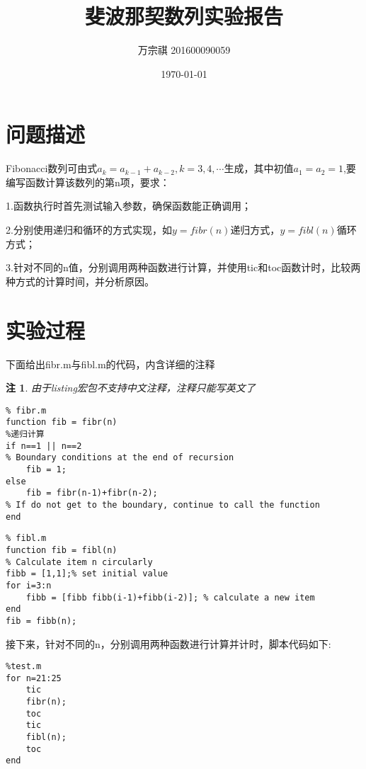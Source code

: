 \documentclass[UTF8]{article}
\title{斐波那契数列实验报告}
\author{万宗祺 201600090059}
\date{\today}
\newtheorem*{note}{注}
\begin{document}
\maketitle
\tableofcontents
\section{问题描述}
Fibonacci数列可由式$a_k = a_{k-1}+a_{k-2},k=3,4,\cdots$生成，其中初值$a_1=a_2=1$,要编写函数计算该数列的第n项，要求：

1.函数执行时首先测试输入参数，确保函数能正确调用；

2.分别使用递归和循环的方式实现，如$y=fibr(n)$递归方式，$y=fibl(n)$循环方式；

3.针对不同的n值，分别调用两种函数进行计算，并使用tic和toc函数计时，比较两种方式的计算时间，并分析原因。

\section{实验过程}
下面给出fibr.m与fibl.m的代码，内含详细的注释
\begin{note}
由于listing宏包不支持中文注释，注释只能写英文了
\end{note}
\lstset{language=Matlab}
\begin{lstlisting}
% fibr.m
function fib = fibr(n)
%递归计算
if n==1 || n==2 
% Boundary conditions at the end of recursion 
    fib = 1;
else
    fib = fibr(n-1)+fibr(n-2); 
% If do not get to the boundary, continue to call the function
end
\end{lstlisting}

\begin{lstlisting}
% fibl.m
function fib = fibl(n)
% Calculate item n circularly
fibb = [1,1];% set initial value
for i=3:n 
    fibb = [fibb fibb(i-1)+fibb(i-2)]; % calculate a new item
end
fib = fibb(n);
\end{lstlisting}

接下来，针对不同的n，分别调用两种函数进行计算并计时，脚本代码如下:

\begin{lstlisting}
%test.m
for n=21:25
    tic
    fibr(n);
    toc
    tic
    fibl(n);
    toc
end
\end{lstlisting}
\end{document}
